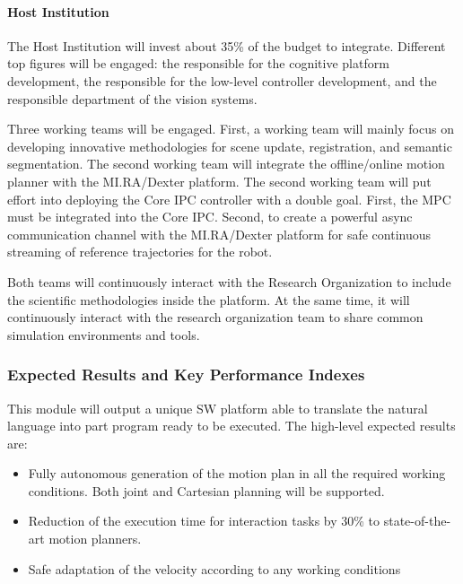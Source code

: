 \paragraph{Host Institution}\label{host-institution-1}

The Host Institution will invest about 35\% of the budget to integrate.
Different top figures will be engaged: the responsible for the cognitive
platform development, the responsible for the low-level controller
development, and the responsible department of the vision systems.

Three working teams will be engaged. First, a working team will mainly
focus on developing innovative methodologies for scene update,
registration, and semantic segmentation. The second working team will
integrate the offline/online motion planner with the MI.RA/Dexter
platform. The second working team will put effort into deploying the
Core IPC controller with a double goal. First, the MPC must be
integrated into the Core IPC. Second, to create a powerful async
communication channel with the MI.RA/Dexter platform for safe continuous
streaming of reference trajectories for the robot.

Both teams will continuously interact with the Research Organization to
include the scientific methodologies inside the platform. At the same
time, it will continuously interact with the research organization team
to share common simulation environments and tools.

\subsubsection{\texorpdfstring{Expected Results and Key Performance
Indexes
}{Expected Results and Key Performance Indexes }}\label{expected-results-and-key-performance-indexes-1}

This module will output a unique SW platform able to translate the
natural language into part program ready to be executed. The high-level
expected results are:

\begin{itemize}
\item
  Fully autonomous generation of the motion plan in all the required
  working conditions. Both joint and Cartesian planning will be
  supported.
\item
  Reduction of the execution time for interaction tasks by 30\% to
  state-of-the-art motion planners.
\item
  Safe adaptation of the velocity according to any working conditions
\end{itemize}

